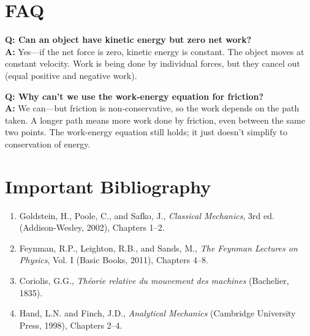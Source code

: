 \section*{FAQ}

\textbf{Q: Can an object have kinetic energy but zero net work?}\\
\textbf{A:} Yes---if the net force is zero, kinetic energy is constant. The object moves at constant velocity. Work is being done by individual forces, but they cancel out (equal positive and negative work).

\textbf{Q: Why can't we use the work-energy equation for friction?}\\
\textbf{A:} We can---but friction is non-conservative, so the work depends on the path taken. A longer path means more work done by friction, even between the same two points. The work-energy equation still holds; it just doesn't simplify to conservation of energy.
\section*{Important Bibliography}

\begin{enumerate}
\item Goldstein, H., Poole, C., and Safko, J., \textit{Classical Mechanics}, 3rd ed. (Addison-Wesley, 2002), Chapters 1--2.
\item Feynman, R.P., Leighton, R.B., and Sands, M., \textit{The Feynman Lectures on Physics}, Vol. I (Basic Books, 2011), Chapters 4--8.
\item Coriolis, G.G., \textit{Th\'eorie relative du mouvement des machines} (Bachelier, 1835).
\item Hand, L.N. and Finch, J.D., \textit{Analytical Mechanics} (Cambridge University Press, 1998), Chapters 2--4.
\end{enumerate}

